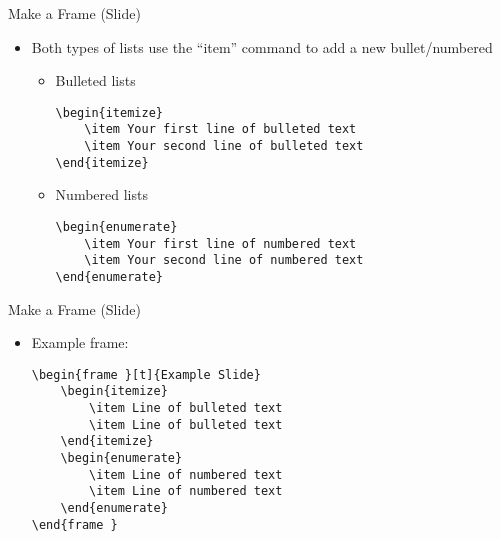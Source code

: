\begin{frame}[fragile,t]{Make a Frame (Slide)}
	\begin{itemize}
		\item Both types of lists use the ``item'' command to add a new bullet/numbered
		\begin{itemize}
			\item Bulleted lists
			\begin{lstlisting}
\begin{itemize}
	\item Your first line of bulleted text
	\item Your second line of bulleted text
\end{itemize}
			\end{lstlisting}
\vspace{0.2in}
			\item Numbered lists
			\begin{lstlisting}
\begin{enumerate}
	\item Your first line of numbered text
	\item Your second line of numbered text
\end{enumerate}
			\end{lstlisting}
		\end{itemize}
	\end{itemize}
\end{frame}

\begin{frame}[fragile,t]{Make a Frame (Slide)}
	\begin{itemize}
		\item Example frame:
		\begin{lstlisting}
\begin{frame }[t]{Example Slide}
	\begin{itemize}
		\item Line of bulleted text
		\item Line of bulleted text
	\end{itemize}
	\begin{enumerate}
		\item Line of numbered text
		\item Line of numbered text
	\end{enumerate}
\end{frame }
		\end{lstlisting}
	\end{itemize}
\end{frame}

